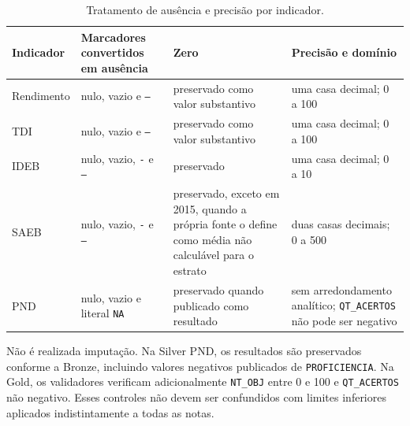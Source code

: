 \begin{table}[H]
\centering
\scriptsize
\caption{Tratamento de ausência e precisão por indicador.}
\label{tab:ap-ausencias}
\renewcommand{\arraystretch}{1.15}
\begin{tabular}{|p{2.8cm}|p{4.4cm}|p{4.3cm}|p{3.85cm}|}
\hline
\textbf{Indicador} & \textbf{Marcadores convertidos em ausência} & \textbf{Zero} & \textbf{Precisão e domínio} \\ \hline
Rendimento & nulo, vazio e \texttt{--} & preservado como valor substantivo & uma casa decimal; 0 a 100 \\ \hline
TDI & nulo, vazio e \texttt{--} & preservado como valor substantivo & uma casa decimal; 0 a 100 \\ \hline
IDEB & nulo, vazio, \texttt{-} e \texttt{--} & preservado & uma casa decimal; 0 a 10 \\ \hline
SAEB & nulo, vazio, \texttt{-} e \texttt{--} & preservado, exceto em 2015, quando a própria fonte o define como média não calculável para o estrato & duas casas decimais; 0 a 500 \\ \hline
PND & nulo, vazio e literal \texttt{NA} & preservado quando publicado como resultado & sem arredondamento analítico; \texttt{QT\_ACERTOS} não pode ser negativo \\ \hline
\end{tabular}
\end{table}

Não é realizada imputação. Na Silver PND, os resultados são preservados conforme a Bronze, incluindo valores negativos publicados de \texttt{PROFICIENCIA}. Na Gold, os validadores verificam adicionalmente \texttt{NT\_OBJ} entre 0 e 100 e \texttt{QT\_ACERTOS} não negativo. Esses controles não devem ser confundidos com limites inferiores aplicados indistintamente a todas as notas.
